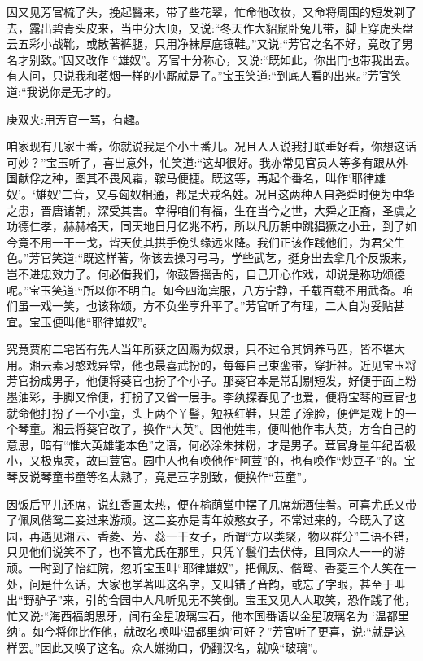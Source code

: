 \begin{parag}
    因又见芳官梳了头，挽起䰖来，带了些花翠，忙命他改妆，又命将周围的短发剃了去，露出碧青头皮来，当中分大顶，又说:“冬天作大貂鼠卧兔儿带，脚上穿虎头盘云五彩小战靴，或散著裤腿，只用净袜厚底镶鞋。”又说:“芳官之名不好，竟改了男名才别致。”因又改作 “雄奴”。芳官十分称心，又说:“既如此，你出门也带我出去。有人问，只说我和茗烟一样的小厮就是了。”宝玉笑道:“到底人看的出来。”芳官笑道:“我说你是无才的。\begin{note}庚双夹:用芳官一骂，有趣。\end{note}咱家现有几家土番，你就说我是个小土番儿。况且人人说我打联垂好看，你想这话可妙？”宝玉听了，喜出意外，忙笑道:“这却很好。我亦常见官员人等多有跟从外国献俘之种，图其不畏风霜，鞍马便捷。既这等，再起个番名，叫作‘耶律雄奴’。‘雄奴’二音，又与匈奴相通，都是犬戎名姓。况且这两种人自尧舜时便为中华之患，晋唐诸朝，深受其害。幸得咱们有福，生在当今之世，大舜之正裔，圣虞之功德仁孝，赫赫格天，同天地日月亿兆不朽，所以凡历朝中跳猖獗之小丑，到了如今竟不用一干一戈，皆天使其拱手俛头缘远来降。我们正该作践他们，为君父生色。”芳官笑道:“既这样著，你该去操习弓马，学些武艺，挺身出去拿几个反叛来，岂不进忠效力了。何必借我们，你鼓唇摇舌的，自己开心作戏，却说是称功颂德呢。”宝玉笑道:“所以你不明白。如今四海宾服，八方宁静，千载百载不用武备。咱们虽一戏一笑，也该称颂，方不负坐享升平了。”芳官听了有理，二人自为妥贴甚宜。宝玉便叫他“耶律雄奴”。
\end{parag}


\begin{parag}
    究竟贾府二宅皆有先人当年所获之囚赐为奴隶，只不过令其饲养马匹，皆不堪大用。湘云素习憨戏异常，他也最喜武扮的，每每自己束銮带，穿折袖。近见宝玉将芳官扮成男子，他便将葵官也扮了个小子。那葵官本是常刮剔短发，好便于面上粉墨油彩，手脚又伶便，打扮了又省一层手。李纨探春见了也爱，便将宝琴的荳官也就命他打扮了一个小童，头上两个丫髻，短袄红鞋，只差了涂脸，便俨是戏上的一个琴童。湘云将葵官改了，换作“大英”。因他姓韦，便叫他作韦大英，方合自己的意思，暗有“惟大英雄能本色”之语，何必涂朱抹粉，才是男子。荳官身量年纪皆极小，又极鬼灵，故曰荳官。园中人也有唤他作“阿荳”的，也有唤作“炒豆子”的。宝琴反说琴童书童等名太熟了，竟是荳字别致，便换作“荳童”。
\end{parag}


\begin{parag}
    因饭后平儿还席，说红香圃太热，便在榆荫堂中摆了几席新酒佳肴。可喜尤氏又带了佩凤偕鸳二妾过来游顽。这二妾亦是青年姣憨女子，不常过来的，今既入了这园，再遇见湘云、香菱、芳、蕊一干女子，所谓“方以类聚，物以群分”二语不错，只见他们说笑不了，也不管尤氏在那里，只凭丫鬟们去伏侍，且同众人一一的游顽。一时到了怡红院，忽听宝玉叫“耶律雄奴”，把佩凤、偕鸳、香菱三个人笑在一处，问是什么话，大家也学著叫这名字，又叫错了音韵，或忘了字眼，甚至于叫出“野驴子”来，引的合园中人凡听见无不笑倒。宝玉又见人人取笑，恐作践了他，忙又说:“海西福朗思牙，闻有金星玻璃宝石，他本国番语以金星玻璃名为 ‘温都里纳’。如今将你比作他，就改名唤叫‘温都里纳’可好？”芳官听了更喜，说:“就是这样罢。”因此又唤了这名。众人嫌拗口，仍翻汉名，就唤“玻璃”。
\end{parag}


